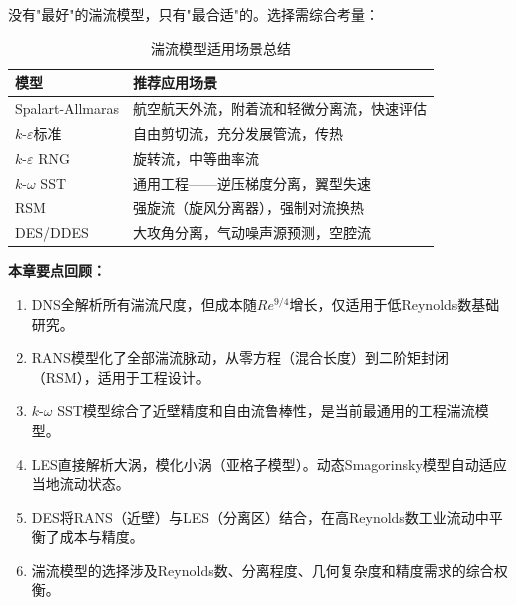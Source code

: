 没有"最好"的湍流模型，只有"最合适"的。选择需综合考量：

\begin{table}[H]
\centering
\caption{湍流模型适用场景总结}
\label{tab:model_selection}
\begin{tabular}{p{4.5cm}p{8.5cm}}
\toprule
\textbf{模型} & \textbf{推荐应用场景} \\
\midrule
Spalart-Allmaras & 航空航天外流，附着流和轻微分离流，快速评估 \\
$k$-$\varepsilon$标准 & 自由剪切流，充分发展管流，传热 \\
$k$-$\varepsilon$ RNG & 旋转流，中等曲率流 \\
$k$-$\omega$ SST & 通用工程——逆压梯度分离，翼型失速 \\
RSM & 强旋流（旋风分离器），强制对流换热 \\
DES/DDES & 大攻角分离，气动噪声源预测，空腔流 \\
\bottomrule
\end{tabular}
\end{table}

\vspace{12pt}

\noindent\textbf{本章要点回顾：}
\begin{enumerate}
  \item DNS全解析所有湍流尺度，但成本随$Re^{9/4}$增长，仅适用于低Reynolds数基础研究。
  \item RANS模型化了全部湍流脉动，从零方程（混合长度）到二阶矩封闭（RSM），适用于工程设计。
  \item $k$-$\omega$ SST模型综合了近壁精度和自由流鲁棒性，是当前最通用的工程湍流模型。
  \item LES直接解析大涡，模化小涡（亚格子模型）。动态Smagorinsky模型自动适应当地流动状态。
  \item DES将RANS（近壁）与LES（分离区）结合，在高Reynolds数工业流动中平衡了成本与精度。
  \item 湍流模型的选择涉及Reynolds数、分离程度、几何复杂度和精度需求的综合权衡。
\end{enumerate}
